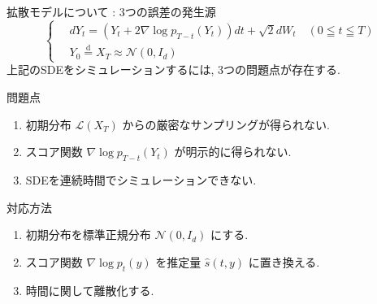 \documentclass[11pt]{beamer}
\newcommand{\Pdata}{P_{\text{data}}}
\newcommand{\StdNormal}{\mathcal{N}(0,I_d)}
\begin{document}
\begin{frame}{拡散モデルについて : 3つの誤差の発生源}
    \begin{equation*}
        \left\{ \,
            \begin{aligned}
            & dY_t = (Y_t+2\nabla \log{p_{T-t}(Y_t)})dt+\sqrt{2}dW_t \quad (0\leqq t \leqq T) \\
            & Y_0 \stackrel{\mathrm{d}}{=} X_T\approx \StdNormal
            \end{aligned}
        \right.
    \end{equation*}
      上記のSDEをシミュレーションするには, 3つの問題点が存在する.
      \begin{block}{問題点}
        \begin{enumerate}
          \item 初期分布 $\mathcal{L}(X_T)$ からの厳密なサンプリングが得られない.
          \item スコア関数 $\nabla \log{p_{T-t}(Y_t)}$ が明示的に得られない.
          \item SDEを連続時間でシミュレーションできない.
        \end{enumerate}
      \end{block}
      \begin{block}{対応方法}
        \begin{enumerate}
          \item 初期分布を標準正規分布 $\StdNormal$ にする.
          \item スコア関数 $\nabla\log{p_{t}(y)}$ を推定量 $\hat{s}(t,y)$ に置き換える.
          \item 時間に関して離散化する.
        \end{enumerate}
      \end{block}
\end{frame}
\end{document}
